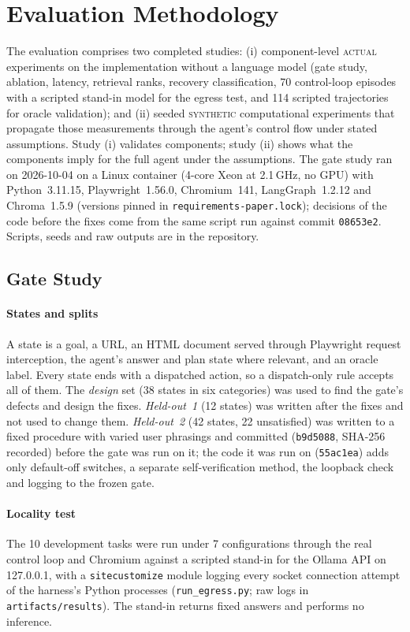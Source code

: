 \section{Evaluation Methodology}
\label{sec:method}

The evaluation comprises two completed studies: (i) component-level \textsc{actual} experiments on the implementation without a language model (gate study, ablation, latency, retrieval ranks, recovery classification, 70 control-loop episodes with a scripted stand-in model for the egress test, and 114 scripted trajectories for oracle validation); and (ii) seeded \textsc{synthetic} computational experiments that propagate those measurements through the agent's control flow under stated assumptions. Study (i) validates components; study (ii) shows what the components imply for the full agent under the assumptions. The gate study ran on 2026-10-04 on a Linux container (4-core Xeon at 2.1\,GHz, no GPU) with Python~3.11.15, Playwright~1.56.0, Chromium~141, LangGraph~1.2.12 and Chroma~1.5.9 (versions pinned in \texttt{requirements-paper.lock}); decisions of the code before the fixes come from the same script run against commit \texttt{08653e2}. Scripts, seeds and raw outputs are in the repository.

\subsection{Gate Study}
\label{sec:method-gate}

\paragraph{States and splits} A state is a goal, a URL, an HTML document served through Playwright request interception, the agent's answer and plan state where relevant, and an oracle label. Every state ends with a dispatched action, so a dispatch-only rule accepts all of them. The \emph{design} set (38 states in six categories) was used to find the gate's defects and design the fixes. \emph{Held-out~1} (12 states) was written after the fixes and not used to change them. \emph{Held-out~2} (42 states, 22 unsatisfied) was written to a fixed procedure with varied user phrasings and committed (\texttt{b9d5088}, SHA-256 recorded) before the gate was run on it; the code it was run on (\texttt{55ac1ea}) adds only default-off switches, a separate self-verification method, the loopback check and logging to the frozen gate.

\paragraph{Locality test} The 10 development tasks were run under 7 configurations through the real control loop and Chromium against a scripted stand-in for the Ollama API on 127.0.0.1, with a \texttt{sitecustomize} module logging every socket connection attempt of the harness's Python processes (\texttt{run\_egress.py}; raw logs in \texttt{artifacts/results}). The stand-in returns fixed answers and performs no inference.

